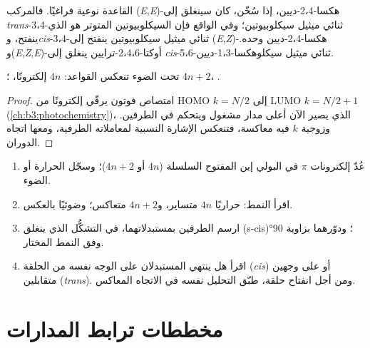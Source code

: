 القاعدة نوعية فراغيًا. فالمركب (\textit{E},\textit{E})-هكسا-2،4-ديين، إذا سُخّن، كان سينغلق
 إلى \textit{trans}-3،4-ثنائي ميثيل سيكلوبيوتين؛ وفي الواقع فإن
السيكلوبيوتين المتوتر هو الذي ينفتح، و\textit{cis}-3،4-ثنائي ميثيل سيكلوبيوتين ينفتح
 إلى (\textit{E},\textit{Z})-هكسا-2،4-ديين وحده. و(\textit{E},\textit{Z},\textit{E})-أوكتا-2،4،6-ترايين ينغلق
 إلى \textit{cis}-5،6-ثنائي ميثيل سيكلوهكسا-1،3-ديين.

\begin{proposition}\label{prop:b3:pericyclic:photo-electrocyclic}
تحت الضوء تنعكس القواعد: $4n$ إلكترونًا، ؛ $4n + 2$، .
\end{proposition}

\begin{proof}
امتصاص فوتون يرقّي إلكترونًا من HOMO $k = N/2$ إلى LUMO $k = N/2 + 1$
(\cref{ch:b3:photochemistry})، الذي يصير الآن أعلى مدار مشغول 
ويتحكم في الطرفين. وزوجية $k$ فيه معاكسة، فتنعكس الإشارة النسبية
لمعاملاته الطرفية، ومعها اتجاه الدوران.
\end{proof}

\begin{method}\label{met:b3:pericyclic:predict-stereo}
\begin{enumerate}
  \item عُدّ إلكترونات $\pi$ في البولي إين المفتوح السلسلة ($4n$ أو $4n + 2$)؛ وسجّل الحرارة أو
        الضوء.
  \item اقرأ النمط: حراريًا $4n$ متساير، و$4n + 2$ متعاكس؛ وضوئيًا بالعكس.
  \item ارسم الطرفين بمستبدلاتهما، في التشكُّل الذي
        ينغلق (s-cis)؛ ودوّرهما بزاوية 90° وفق النمط المختار.
  \item اقرأ هل ينتهي المستبدلان على الوجه نفسه من الحلقة
        (\textit{cis}) أو على وجهين متقابلين (\textit{trans}). ومن أجل انفتاح حلقة، طبّق التحليل
        نفسه في الاتجاه المعاكس.
\end{enumerate}
\end{method}

\section{مخططات ترابط المدارات}

